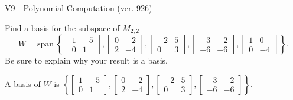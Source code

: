 \begin{exercise}
  \begin{exerciseTitle}V9 - Polynomial Computation (ver. 926)\end{exerciseTitle}
  \begin{exerciseStatement}
    Find a basis for the subspace of \(M_{2,2}\) 
\[W=\mathrm{span}\ \left\{\left[\begin{array}{cc}
1 & -5 \\
0 & 1
\end{array}\right] , \left[\begin{array}{cc}
0 & -2 \\
2 & -4
\end{array}\right] , \left[\begin{array}{cc}
-2 & 5 \\
0 & 3
\end{array}\right] , \left[\begin{array}{cc}
-3 & -2 \\
-6 & -6
\end{array}\right] , \left[\begin{array}{cc}
1 & 0 \\
0 & -4
\end{array}\right]\right\}.\]
 Be sure to explain why your result is a basis.


  \end{exerciseStatement}
  \begin{exerciseAnswer}
   A basis of \(W\) is  \(\left\{\left[\begin{array}{cc}
1 & -5 \\
0 & 1
\end{array}\right] , \left[\begin{array}{cc}
0 & -2 \\
2 & -4
\end{array}\right] , \left[\begin{array}{cc}
-2 & 5 \\
0 & 3
\end{array}\right] , \left[\begin{array}{cc}
-3 & -2 \\
-6 & -6
\end{array}\right]\right\}\).
  


  \end{exerciseAnswer}
\end{exercise}